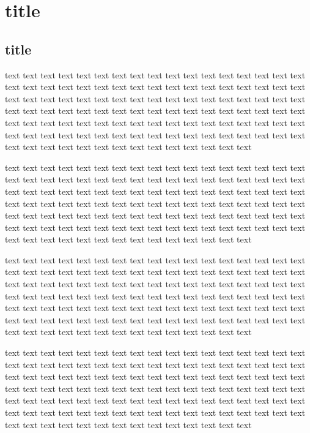 \documentclass[12pt,a4paper,x11names,usenames,dvipsnames,svgnames,oneside]{book}
\begin{document}
\pagestyle{empty}
	\tableofcontents
	\chapter{title}
	\section{title}
	\begin{act}
		text text text text text text text text text text text text text text text text text text text text text text text text text text text text text text text text text text text text text text text text text text text text text text text text text text text text text text text text text text text text text text text text text text text text text text text text text text text text text text text text text text text text text text text text text text text text text text text text text text text text text text text text text text text text text text text text text text text text
	\end{act}
\begin{df}
text text text text text text text text text text text text text text text text text text text text text text text text text text text text text text text text text text text text text text text text text text text text text text text text text text text text text text text text text text text text text text text text text text text text text text text text text text text text text text text text text text text text text text text text text text text text text text text text text text text text text text text text text text text text text text text text text text text text
\end{df}
\begin{expl}
	text text text text text text text text text text text text text text text text text text text text text text text text text text text text text text text text text text text text text text text text text text text text text text text text text text text text text text text text text text text text text text text text text text text text text text text text text text text text text text text text text text text text text text text text text text text text text text text text text text text text text text text text text text text text text text text text text text text text
\end{expl}
\begin{pr}
	text text text text text text text text text text text text text text text text text text text text text text text text text text text text text text text text text text text text text text text text text text text text text text text text text text text text text text text text text text text text text text text text text text text text text text text text text text text text text text text text text text text text text text text text text text text text text text text text text text text text text text text text text text text text text text text text text text text text
\end{pr}
\end{document}
